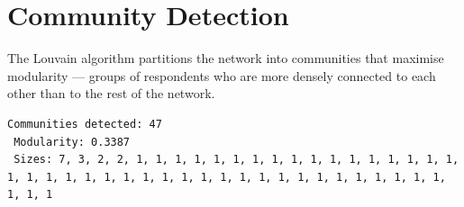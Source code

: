 \documentclass[
  letterpaper,
  DIV=11,
  numbers=noendperiod]{scrartcl}
\newenvironment{Shaded}{\begin{snugshade}}{\end{snugshade}}
\newcommand{\AttributeTok}[1]{\textcolor[rgb]{0.40,0.45,0.13}{#1}}
\newcommand{\CommentTok}[1]{\textcolor[rgb]{0.37,0.37,0.37}{#1}}
\newcommand{\ConstantTok}[1]{\textcolor[rgb]{0.56,0.35,0.01}{#1}}
\newcommand{\DecValTok}[1]{\textcolor[rgb]{0.68,0.00,0.00}{#1}}
\newcommand{\FunctionTok}[1]{\textcolor[rgb]{0.28,0.35,0.67}{#1}}
\newcommand{\NormalTok}[1]{\textcolor[rgb]{0.00,0.23,0.31}{#1}}
\newcommand{\OtherTok}[1]{\textcolor[rgb]{0.00,0.23,0.31}{#1}}
\newcommand{\SpecialCharTok}[1]{\textcolor[rgb]{0.37,0.37,0.37}{#1}}
\newcommand{\StringTok}[1]{\textcolor[rgb]{0.13,0.47,0.30}{#1}}
\begin{document}
\section{Community Detection}\label{community-detection}

The Louvain algorithm partitions the network into communities that
maximise modularity --- groups of respondents who are more densely
connected to each other than to the rest of the network.

\begin{Shaded}
\end{Shaded}

\begin{verbatim}
Communities detected: 47 
 Modularity: 0.3387 
 Sizes: 7, 3, 2, 2, 1, 1, 1, 1, 1, 1, 1, 1, 1, 1, 1, 1, 1, 1, 1, 1, 1, 1, 1, 1, 1, 1, 1, 1, 1, 1, 1, 1, 1, 1, 1, 1, 1, 1, 1, 1, 1, 1, 1, 1, 1, 1, 1 
\end{verbatim}
\end{document}
